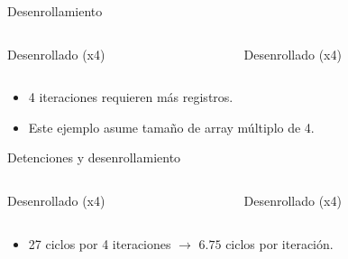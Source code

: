 \begin{frame}[t]{Desenrollamiento}

\begin{columns}

\begin{column}{.45\textwidth}
\begin{block}{Desenrollado (x4)}

\end{block}
\end{column}

\begin{column}{.45\textwidth}
\begin{block}{Desenrollado (x4)}

\end{block}
\end{column}

\end{columns}
\begin{itemize}
  \item 4 iteraciones requieren más registros.
  \item Este ejemplo asume tamaño de array múltiplo de 4.
\end{itemize}
\end{frame}

\begin{frame}[t]{Detenciones y desenrollamiento}

\begin{columns}

\begin{column}{.45\textwidth}
\begin{block}{Desenrollado (x4)}

\end{block}
\end{column}

\begin{column}{.45\textwidth}
\begin{block}{Desenrollado (x4)}

\end{block}
\end{column}

\end{columns}
\begin{itemize}
  \item 27 ciclos por 4 iteraciones $\rightarrow$ $6.75$ ciclos por iteración.
\end{itemize}
\end{frame}


